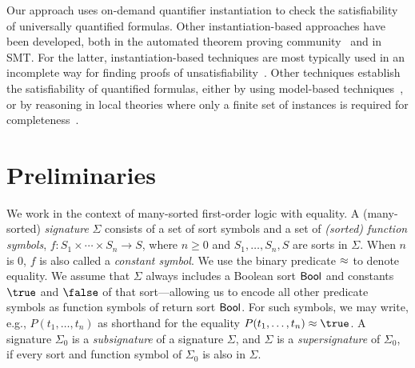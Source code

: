 \documentclass{svjour3}                     %
\begin{document}
Our approach uses on-demand quantifier instantiation to check the satisfiability of universally quantified formulas.
Other instantiation-based approaches have been developed, both in the automated
theorem proving community~\cite{Kor08-IJCAR} and in SMT. 
For the latter, instantiation-based techniques are most typically used 
in an incomplete way 
for finding proofs of unsatisfiability~\cite{Detlefs03simplify:a,GBT09,DBLP:conf/cade/MouraB07}.
Other techniques establish the satisfiability of 
quantified formulas,
either by using model-based techniques~\cite{GeDeM-CAV-09},
or by reasoning in local theories where only a finite set of instances is required 
for completeness~\cite{ihlemann2008}.

\section{Preliminaries}
\label{sec:prelim}

We work in the context of many-sorted first-order logic 
with equality. %
A (many-sorted) \emph{signature} $\Sigma$ consists of 
a set of sort symbols and
a set of \emph{(sorted) function symbols},
$f : S_1 \times \cdots \times S_n \rightarrow S$,
where $n \geq 0$ and $S_1, \ldots, S_n, S$ are sorts in $\Sigma$.
When $n$ is 0, 
$f$ is also called a \emph{constant symbol}.
We use the binary predicate $\approx$ to denote equality.
We assume that $\Sigma$ always includes a Boolean sort $\mathsf{Bool}$ and 
constants $\true$ and $\false$ of that sort---allowing us to encode all other predicate symbols as
function symbols of return sort $\mathsf{Bool}$.
For such symbols, we may write, e.g., $P( t_1, \ldots, t_n )$ as shorthand for the equality $P( t_1, \ldots, t_n ) \teq \true$.
A signature $\Sigma_0$ is a \emph{subsignature} of a signature $\Sigma$,
and  $\Sigma$ is a \emph{supersignature} of $\Sigma_0$,
if every sort and function symbol of $\Sigma_0$ is also in $\Sigma$.
\end{document}
